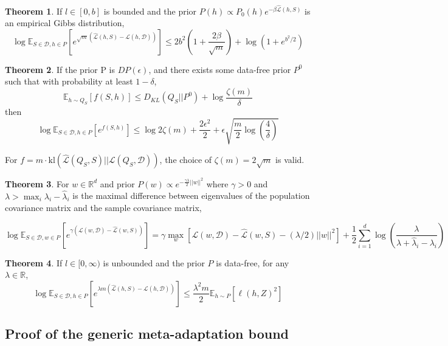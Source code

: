 \documentclass{article}
\theoremstyle{definition}
\newtheorem{theorem}{Theorem}[section]
\newcommand{\Expect}[2]{\mathbb{E}_{#1}\left [#2 \right ]}
\begin{document}
\begin{theorem} \citep{Rivasplata2020}
	If $l\in[0,b]$ is bounded and the prior $P(h)\propto P_0(h)e^{-\beta\hat{\mathcal{L}}(h,S)}$ is an empirical Gibbs distribution, 
	$$\log \Expect{S\in \mathcal{D}, h\in P}{e^{\sqrt{m}(\hat{\mathcal{L}}(h,S)-\mathcal{L}(h,\mathcal{D}))}} \leq 2b^2(1+\frac{2\beta}{\sqrt{m}})+\log(1+e^{b^2/2})$$
\end{theorem}

\begin{theorem} \citep{Rivasplata2020, Dziugaite2018}
	If the prior P is $DP(\epsilon)$, and there exists some data-free prior $P^0$ such that with probability at least $1-\delta$,
	$$\Expect{h\sim Q_S}{f(S,h)} \leq D_{KL}(Q_S||P^0)+\log\frac{\zeta(m)}{\delta}$$
	then 
	$$\log \Expect{S\in \mathcal{D}, h\in P}{e^{f(S,h)}} \leq \log 2\zeta(m) + \frac{2\epsilon^2}{2}+\epsilon\sqrt{\frac{m}{2}\log(\frac{4}{\delta})}$$
	
	For $f=m\cdot \mathrm{kl}(\hat{\mathcal{L}}(Q_S,S)||\mathcal{L}(Q_S,\mathcal{D}))$, the choice of $\zeta(m)=2\sqrt{m}$ is valid.
\end{theorem}

\begin{theorem} \citep{Rivasplata2020}
	For $w\in\mathbb{R}^d$ and prior $P(w)\propto e^{-\frac{\gamma\lambda}{2}||w||^2}$ where $\gamma>0$ and $\lambda>\max_i{\lambda_i-\hat{\lambda}_i}$ is the maximal difference between eigenvalues of the population covariance matrix and the sample covariance matrix,
	
	$$\log \Expect{S\in \mathcal{D}, w\in P}{e^{\gamma(\mathcal{L}(w,\mathcal{D})-\hat{\mathcal{L}}(w,S))}} = \gamma\max_w{\left [\mathcal{L}(w,\mathcal{D})-\hat{\mathcal{L}}(w,S)-(\lambda/2)||w||^2\right ]} + \frac{1}{2}\sum_{i=1}^{d}\log\left (\frac{\lambda}{\lambda+\hat{\lambda}_i-\lambda_i} \right ) $$
\end{theorem}

\begin{theorem} \citep{Rivasplata2020}
	If $l\in[0,\infty)$ is unbounded and the prior $P$ is data-free, for any $\lambda\in \mathbb{R}$,
	$$\log \Expect{S\in \mathcal{D}, h\in P}{e^{\lambda m(\hat{\mathcal{L}}(h,S)-\mathcal{L}(h,\mathcal{D}))}} \leq \frac{\lambda^2m}{2}\Expect{h\sim P}{\ell(h,Z)^2}$$
\end{theorem}

\subsection{Proof of the generic meta-adaptation bound} \label{append:proof-main-result}
\end{document}
